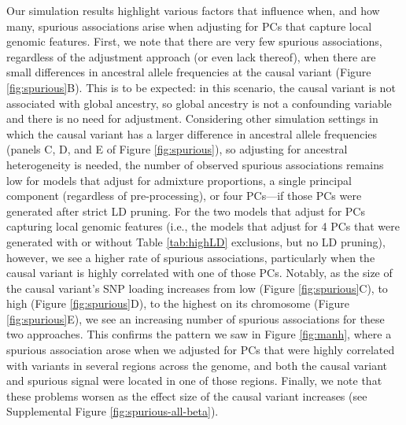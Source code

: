 \documentclass[12pt]{article}
\begin{document}
Our simulation results highlight various factors that influence when, and how many, spurious associations arise when adjusting for PCs that capture local genomic features.
First, we note that there are very few spurious associations, regardless of the adjustment approach (or even lack thereof), when there are small differences in ancestral allele frequencies at the causal variant (Figure \ref{fig:spurious}B). 
This is to be expected: in this scenario, the causal variant is not associated with global ancestry, so global ancestry is not a confounding variable  and there is no need for adjustment.
Considering other simulation settings in which the causal variant has a larger difference in ancestral allele frequencies (panels C, D, and E of Figure \ref{fig:spurious}), so adjusting for ancestral heterogeneity is needed, the number of observed spurious associations remains low for models that adjust for admixture proportions, a single principal component (regardless of pre-processing), or four PCs---if those PCs were  generated after strict LD pruning.
For the two models that adjust for PCs capturing local genomic features (i.e., the models that adjust for 4 PCs that were generated with or without Table \ref{tab:highLD} exclusions, but no LD pruning), however, we see a higher rate of spurious associations, particularly when the causal variant is highly correlated with one of those PCs.
Notably, as the size of the causal variant's SNP loading increases from low (Figure \ref{fig:spurious}C), to high (Figure \ref{fig:spurious}D), to the highest on its chromosome (Figure \ref{fig:spurious}E), we see an increasing number of spurious associations for these two approaches.
This confirms the pattern we saw in Figure \ref{fig:manh}, where a spurious association arose when we adjusted for PCs that were highly correlated with variants in several regions across the genome, and both the causal variant and spurious signal were located in one of those regions. 
Finally, we note that these problems worsen as the effect size of the causal variant increases (see Supplemental Figure \ref{fig:spurious-all-beta}).
\end{document}
